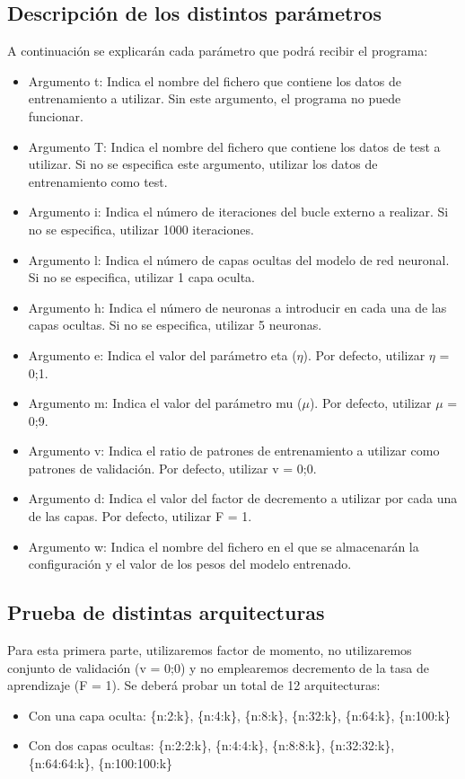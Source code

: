 \subsection{Descripción de los distintos parámetros}
A continuación se explicarán cada parámetro que podrá recibir el programa:
\begin{itemize}
\item Argumento t: Indica el nombre del fichero que contiene los datos de entrenamiento a utilizar. Sin este argumento, el programa no puede funcionar.
\item Argumento T: Indica el nombre del fichero que contiene los datos de test a utilizar. Si no se especifica este argumento, utilizar los datos de entrenamiento como test.
\item Argumento i: Indica el número de iteraciones del bucle externo a  realizar. Si no se especifica, utilizar 1000 iteraciones.
\item Argumento l: Indica el número de capas ocultas del modelo de red neuronal. Si no se especifica, utilizar 1 capa oculta.
\item Argumento h: Indica el número de neuronas a introducir en cada una de las capas ocultas. Si no se especifica, utilizar 5 neuronas.
\item Argumento e: Indica el valor del parámetro eta ($\eta$). Por defecto, utilizar $\eta$ = 0;1.
\item Argumento m: Indica el valor del parámetro mu ($\mu$). Por defecto, utilizar $\mu$ = 0;9.
\item Argumento v: Indica el ratio de patrones de entrenamiento a utilizar como patrones de validación. Por defecto, utilizar v = 0;0.
\item Argumento d: Indica el valor del factor de decremento a utilizar por cada una de las capas. Por defecto, utilizar F = 1.
\item Argumento w: Indica el nombre del fichero en el que se almacenarán la configuración y el valor de los pesos del modelo entrenado.
\end{itemize}


\subsection{Prueba de distintas arquitecturas}
Para esta primera parte, utilizaremos factor de momento, no utilizaremos
conjunto de validación (v = 0;0) y no emplearemos decremento de la tasa de aprendizaje (F = 1). Se deberá probar un total de 12 arquitecturas:
\begin{itemize}
\item Con una capa oculta: \{n:2:k\}, \{n:4:k\}, \{n:8:k\}, \{n:32:k\}, \{n:64:k\}, \{n:100:k\}
\item Con dos capas ocultas: \{n:2:2:k\}, \{n:4:4:k\}, \{n:8:8:k\}, \{n:32:32:k\}, \{n:64:64:k\}, \{n:100:100:k\}
\end{itemize}

